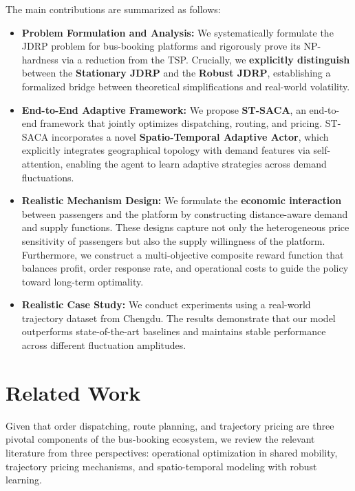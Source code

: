 \documentclass[lettersize,journal]{IEEEtran}
\begin{document}
\color{blue}
The main contributions are summarized as follows:
\begin{itemize}
    \item \textbf{Problem Formulation and Analysis:} We systematically formulate the JDRP problem for bus-booking platforms and rigorously prove its NP-hardness via a reduction from the TSP. Crucially, we \textbf{explicitly distinguish} between the \textbf{Stationary JDRP} and the \textbf{Robust JDRP}, establishing a formalized bridge between theoretical simplifications and real-world volatility.
    
    \item \textbf{End-to-End Adaptive Framework:} We propose \textbf{ST-SACA}, an end-to-end framework that jointly optimizes dispatching, routing, and pricing. ST-SACA incorporates a novel \textbf{Spatio-Temporal Adaptive Actor}, which explicitly integrates geographical topology with demand features via self-attention, enabling the agent to learn adaptive strategies across demand fluctuations.
    
    \item \textbf{Realistic Mechanism Design:} We formulate the \textbf{economic interaction} between passengers and the platform by constructing distance-aware demand and supply functions. These designs capture not only the heterogeneous price sensitivity of passengers but also the supply willingness of the platform. Furthermore, we construct a multi-objective composite reward function that balances profit, order response rate, and operational costs to guide the policy toward long-term optimality.
    
    \item \textbf{Realistic Case Study:} We conduct experiments using a real-world trajectory dataset from Chengdu. The results demonstrate that our model outperforms state-of-the-art baselines and maintains stable performance across different fluctuation amplitudes.
\end{itemize}



\section{Related Work} 
Given that order dispatching, route planning, and trajectory pricing are three pivotal components of the bus-booking ecosystem, we review the relevant literature from three perspectives: operational optimization in shared mobility, trajectory pricing mechanisms, and spatio-temporal modeling with robust learning.
\end{document}
